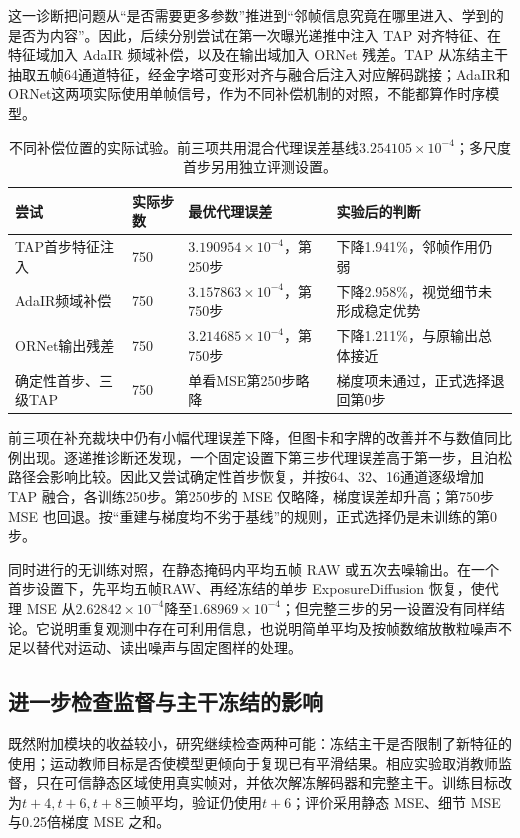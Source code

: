 \documentclass[11pt,a4paper,UTF8,fontset=fandol]{ctexart}
\begin{document}
这一诊断把问题从“是否需要更多参数”推进到“邻帧信息究竟在哪里进入、学到的是否为内容”。因此，后续分别尝试在第一次曝光递推中注入 TAP 对齐特征、在特征域加入 AdaIR 频域补偿，以及在输出域加入 ORNet 残差。TAP 从冻结主干抽取五帧64通道特征，经金字塔可变形对齐与融合后注入对应解码跳接；AdaIR和ORNet这两项实际使用单帧信号，作为不同补偿机制的对照，不能都算作时序模型。

\begin{table}[H]
\centering\small
\caption{不同补偿位置的实际试验。前三项共用混合代理误差基线$3.254105\times10^{-4}$；多尺度首步另用独立评测设置。}
\label{tab:djc_pilots}
\begin{tabular}{P{0.21\textwidth}P{0.12\textwidth}P{0.22\textwidth}P{0.33\textwidth}}
\toprule
尝试 & 实际步数 & 最优代理误差 & 实验后的判断 \\
\midrule
TAP首步特征注入 & 750 & $3.190954\times10^{-4}$，第250步 & 下降1.941\%，邻帧作用仍弱 \\
AdaIR频域补偿 & 750 & $3.157863\times10^{-4}$，第750步 & 下降2.958\%，视觉细节未形成稳定优势 \\
ORNet输出残差 & 750 & $3.214685\times10^{-4}$，第750步 & 下降1.211\%，与原输出总体接近 \\
确定性首步、三级TAP & 750 & 单看MSE第250步略降 & 梯度项未通过，正式选择退回第0步 \\
\bottomrule
\end{tabular}
\end{table}

前三项在补充裁块中仍有小幅代理误差下降，但图卡和字牌的改善并不与数值同比例出现。逐递推诊断还发现，一个固定设置下第三步代理误差高于第一步，且泊松路径会影响比较。因此又尝试确定性首步恢复，并按64、32、16通道逐级增加 TAP 融合，各训练250步。第250步的 MSE 仅略降，梯度误差却升高；第750步 MSE 也回退。按“重建与梯度均不劣于基线”的规则，正式选择仍是未训练的第0步。

同时进行的无训练对照，在静态掩码内平均五帧 RAW 或五次去噪输出。在一个首步设置下，先平均五帧RAW、再经冻结的单步 ExposureDiffusion 恢复，使代理 MSE 从$2.62842\times10^{-4}$降至$1.68969\times10^{-4}$；但完整三步的另一设置没有同样结论。它说明重复观测中存在可利用信息，也说明简单平均及按帧数缩放散粒噪声不足以替代对运动、读出噪声与固定图样的处理。

\subsection{进一步检查监督与主干冻结的影响}

既然附加模块的收益较小，研究继续检查两种可能：冻结主干是否限制了新特征的使用；运动教师目标是否使模型更倾向于复现已有平滑结果。相应实验取消教师监督，只在可信静态区域使用真实帧对，并依次解冻解码器和完整主干。训练目标改为$t+4,t+6,t+8$三帧平均，验证仍使用$t+6$；评价采用静态 MSE、细节 MSE 与0.25倍梯度 MSE 之和。
\end{document}
